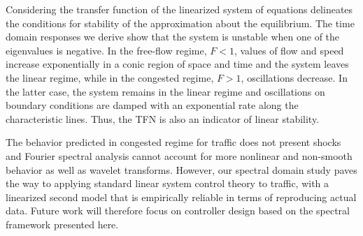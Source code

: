 \documentclass[preprint]{elsarticle}
\begin{document}
Considering the transfer function of the linearized system of equations delineates the conditions for stability of the approximation about the equilibrium. The time domain responses we derive show that the system is unstable when one of the eigenvalues is negative. In the free-flow regime, $F < 1$, values of flow and speed increase exponentially in a conic region of space and time and the system leaves the linear regime, while in the congested regime, $F>1$, oscillations decrease. In the latter case, the system remains in the linear regime and oscillations on boundary conditions are damped with an exponential rate along the characteristic lines. Thus, the TFN is also an indicator of linear stability.

The behavior predicted in congested regime for traffic does not present shocks and Fourier spectral analysis cannot account for more nonlinear and non-smooth behavior as well as wavelet transforms. However, our spectral domain study paves the way to applying standard linear system control theory to traffic, with a linearized second model that is empirically reliable in terms of reproducing actual data. Future work will therefore focus on controller design based on the spectral framework presented here.

\end{document}
